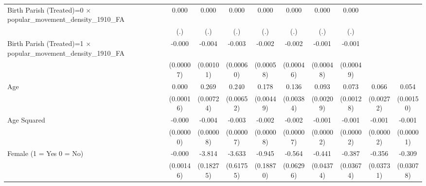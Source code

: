 {\begin{tabular}{l*{9}{c}}
Birth Parish (Treated)=0 $\times$ popular\_movement\_density\_1910\_FA&       0.000         &       0.000         &       0.000         &       0.000         &       0.000         &       0.000         &       0.000         &                     &                     \\
                    &         (.)         &         (.)         &         (.)         &         (.)         &         (.)         &         (.)         &         (.)         &                     &                     \\
Birth Parish (Treated)=1 $\times$ popular\_movement\_density\_1910\_FA&      -0.000         &      -0.004\sym{***}&      -0.003\sym{***}&      -0.002\sym{***}&      -0.002\sym{***}&      -0.001\sym{**} &      -0.001\sym{*}  &                     &                     \\
                    &   (0.00007)         &   (0.00101)         &   (0.00060)         &   (0.00058)         &   (0.00046)         &   (0.00048)         &   (0.00049)         &                     &                     \\
Age                 &       0.000         &       0.269\sym{***}&       0.240\sym{***}&       0.178\sym{***}&       0.136\sym{***}&       0.093\sym{***}&       0.073\sym{***}&       0.066\sym{***}&       0.054\sym{***}\\
                    &   (0.00016)         &   (0.00724)         &   (0.00652)         &   (0.00449)         &   (0.00384)         &   (0.00209)         &   (0.00128)         &   (0.00272)         &   (0.00150)         \\
Age Squared         &      -0.000         &      -0.004\sym{***}&      -0.003\sym{***}&      -0.002\sym{***}&      -0.002\sym{***}&      -0.001\sym{***}&      -0.001\sym{***}&      -0.001\sym{***}&      -0.001\sym{***}\\
                    &   (0.00000)         &   (0.00008)         &   (0.00007)         &   (0.00008)         &   (0.00007)         &   (0.00002)         &   (0.00002)         &   (0.00002)         &   (0.00001)         \\
Female (1 = Yes 0 = No)&      -0.000         &      -3.814\sym{***}&      -3.633\sym{***}&      -0.945\sym{***}&      -0.564\sym{***}&      -0.441\sym{***}&      -0.387\sym{***}&      -0.356\sym{***}&      -0.309\sym{***}\\
                    &   (0.00146)         &   (0.18275)         &   (0.61755)         &   (0.18870)         &   (0.06296)         &   (0.04374)         &   (0.03674)         &   (0.03731)         &   (0.03078)         \\

\end{tabular}}
